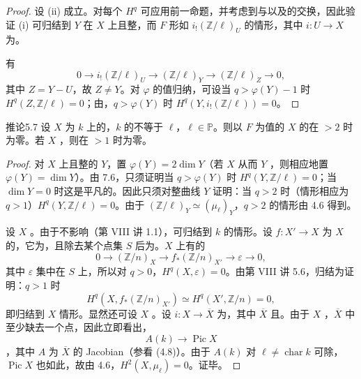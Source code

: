 \begin{proof}
设 (ii) 成立。对每个 $H^q$ 可应用前一命题，并考虑到与以及的交换，因此验证 (i) 可归结到 $Y$ 在 $X$ 上且整，而 $F$ 形如 $i_!(\mathbb Z/\ell)_U$ 的情形，其中 $i:U\to X$ 为。

有
\[
0\longrightarrow i_!(\mathbb Z/\ell)_U\longrightarrow(\mathbb Z/\ell)_Y\longrightarrow(\mathbb Z/\ell)_Z\longrightarrow0,
\]
其中 $Z=Y-U$，故 $Z\ne Y$。对 $\varphi$ 的值归纳，可设当 $q>\varphi(Y)-1$ 时 $H^q(Z,\mathbb Z/\ell)=0$；由，$q>\varphi(Y)$ 时 $H^q(Y,i_!(\mathbb Z/\ell))=0$。
\end{proof}
\begin{SGAresult}{推论}{5.7}
设 $X$ 为 $k$ 上的，$k$ 的不等于 $\ell$，$\ell\in\mathbb P$。则以 $F$ 为值的 $X$ 的在 $>2$ 时为零。若 $X$ ，则在 $>1$ 时为零。
\end{SGAresult}
\begin{proof}
对 $X$ 上且整的 $Y$，置 $\varphi(Y)=2\dim Y$（若 $X$ 从而 $Y$ ，则相应地置 $\varphi(Y)=\dim Y$）。由 7.6，只须证明当 $q>\varphi(Y)$ 时 $H^q(Y,\mathbb Z/\ell)=0$；当 $\dim Y=0$ 时这是平凡的。因此只须对整曲线 $Y$ 证明：当 $q>2$ 时（情形相应为 $q>1$）$H^q(Y,\mathbb Z/\ell)=0$。由于 $(\mathbb Z/\ell)_Y\simeq(\mu_\ell)_Y$，$q>2$ 的情形由 4.6 得到。

设 $X$ 。由于不影响（第 VIII 讲 1.1），可归结到 $k$ 的情形。设 $f:X'\to X$ 为 $X$ 的，它为，且除去某个点集 $S$ 后为。$X$ 上有的
\[
0\longrightarrow(\mathbb Z/n)_X\longrightarrow f_*(\mathbb Z/n)_{X'}\longrightarrow\varepsilon\longrightarrow0,
\]
其中 $\varepsilon$ 集中在 $S$ 上，所以对 $q>0$，$H^q(X,\varepsilon)=0$。由第 VIII 讲 5.6，归结为证明：$q>1$ 时
\[
H^q(X,f_*(\mathbb Z/n)_{X'})\simeq H^q(X',\mathbb Z/n)=0,
\]
即归结到 $X$ 情形。显然还可设 $X$ 。设 $i:X\to\overline X$ 为，其中 $\overline X$ 且。由于 $X$ ，$\overline X$ 中至少缺去一个点，因此立即看出，
\[
A(k)\longrightarrow\operatorname{Pic}X
\]
，其中 $A$ 为 $\overline X$ 的 Jacobian（参看 (4.8)）。由于 $A(k)$ 对 $\ell\ne\operatorname{char}k$ 可除，$\operatorname{Pic}X$ 也如此，故由 4.6，$H^2(X,\mu_\ell)=0$。证毕。
\end{proof}
